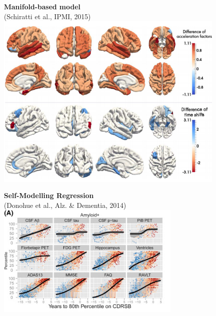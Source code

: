 \documentclass[8pt,xcolor=table]{beamer}
\begin{document}
\begin{frame}
\begin{itemize}
\begin{small}
\begin{figure}[h]
   \begin{minipage}[t][\mnpHeight][t]{0.49\linewidth}
    \centering
    \textbf{Manifold-based model}\\ \footnotesize{(Schiratti et al., IPMI, 2015)}
    \includegraphics[width=1\textwidth,trim=0 270 0 0, clip]{schiratti}
    
    \vspace{2em}
    
    
   \end{minipage}
   \begin{minipage}[t][\mnpHeight][t]{0.49\linewidth}
    \centering
    \textbf{Self-Modelling Regression}\\ \footnotesize{(Donohue et al., Alz. \& Dementia, 2014)}
    \includegraphics[width=0.8\textwidth]{semor_diagram_cropped}
   \end{minipage}


  \end{figure}
  \end{small}
  
  \vspace{-5em}
  
\end{itemize}

\end{frame}
\end{document}
